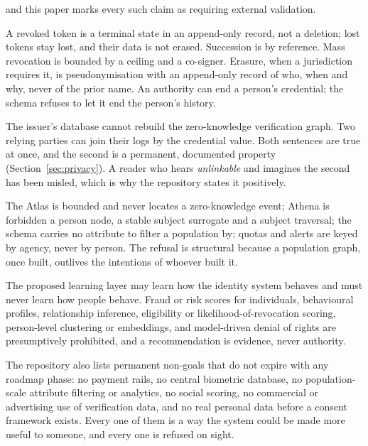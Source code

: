 \begin{description}
    and this paper marks every such claim as requiring external validation.
  \item[Revocation must not become civil erasure.] A revoked token is a terminal state in an
    append-only record, not a deletion; lost tokens stay lost, and their data is not erased.
    Succession is by reference. Mass revocation is bounded by a ceiling and a co-signer. Erasure, when
    a jurisdiction requires it, is pseudonymisation with an append-only record of who, when and why,
    never of the prior name. An authority can end a person's credential; the schema refuses to let it
    end the person's history.
  \item[Relying-party correlation is different from issuer unlinkability.] The issuer's database
    cannot rebuild the zero-knowledge verification graph. Two relying parties can join their logs by
    the credential value. Both sentences are true at once, and the second is a permanent, documented
    property (Section~\ref{sec:privacy}). A reader who hears \emph{unlinkable} and imagines the
    second has been misled, which is why the repository states it positively.
  \item[No population graph.] The Atlas is bounded and never locates a zero-knowledge event; Athena
    is forbidden a person node, a stable subject surrogate and a subject traversal; the schema carries
    no attribute to filter a population by; quotas and alerts are keyed by agency, never by person.
    The refusal is structural because a population graph, once built, outlives the intentions of
    whoever built it.
  \item[Machine learning must not turn identity infrastructure into scoring.] The proposed learning
    layer may learn how the identity system behaves and must never learn how people behave. Fraud
    or risk scores for individuals, behavioural profiles, relationship inference, eligibility or
    likelihood-of-revocation scoring, person-level clustering or embeddings, and model-driven denial
    of rights are presumptively prohibited, and a recommendation is evidence, never authority.
\end{description}

The repository also lists permanent non-goals that do not expire with any roadmap phase: no payment
rails, no central biometric database, no population-scale attribute filtering or analytics, no social
scoring, no commercial or advertising use of verification data, and no real personal data before a
consent framework exists. Every one of them is a way the system could be made more useful to someone,
and every one is refused on sight.

